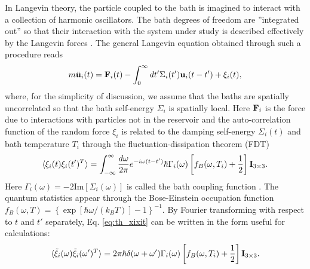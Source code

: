 
In Langevin theory, the particle coupled to the bath is imagined to interact with a collection of harmonic oscillators. The bath degrees of freedom are ''integrated out'' so that their interaction with the system under study is described effectively by the Langevin forces \cite{weiss}. The general Langevin equation obtained through such a procedure reads \cite{dhar06}
\begin{equation}
 m\ddot{\mathbf{u}}_i(t) =  \mathbf{F}_i(t) - \int_{0}^{\infty}dt' \Sigma_i(t') \mathbf{u}_i(t-t') + \xi_i(t), \label{eq:th_eom_langevin}
\end{equation}
where, for the simplicity of discussion, we assume that the baths are spatially uncorrelated so that the bath self-energy $\Sigma_i$ is spatially local. Here $\mathbf{F}_i$ is the force due to interactions with particles not in the reservoir and the auto-correlation function of the random force $\xi_i$ is related to the damping self-energy $\Sigma_i(t)$ and bath temperature $T_i$ through the fluctuation-dissipation theorem (FDT) \cite{dhar06}
\begin{equation}
 \langle \xi_i(t)\xi_i(t') ^T\rangle = \int_{-\infty}^{\infty} \frac{d\omega}{2\pi} e^{-i\omega(t-t')} \hbar \Gamma_i(\omega) \left[f_B(\omega,T_i)+\frac{1}{2}\right] \mathbf{I}_{3\times3}. \label{eq:th_xixit}
\end{equation}
Here $\Gamma_i(\omega)=-2\textrm{Im}[\Sigma_i(\omega)]$ is called the bath coupling function \cite{dhar06}. The quantum statistics appear through the Bose-Einstein occupation function $f_B(\omega,T)=\left\{\exp[\hbar\omega/(k_BT)]-1 \right\}^{-1}$. By Fourier transforming with respect to $t$ and $t'$ separately, Eq. \eqref{eq:th_xixit} can be written in the form useful for calculations:
\begin{equation}
  \langle\tilde  \xi_i(\omega)\tilde \xi_i(\omega')^T \rangle = 2\pi\hbar\delta(\omega+\omega') \Gamma_i(\omega) \left[f_B(\omega,T_i)+\frac{1}{2} \right] \mathbf{I}_{3\times3}. \label{eq:th_xixiom}
\end{equation}

